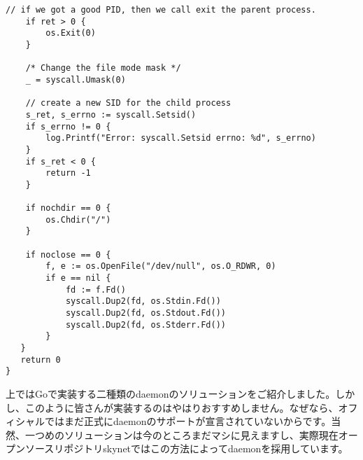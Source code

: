 \begin{itemize}
\begin{lstlisting}[numbers=none]
    // if we got a good PID, then we call exit the parent process.
    if ret > 0 {
        os.Exit(0)
    }

    /* Change the file mode mask */
    _ = syscall.Umask(0)

    // create a new SID for the child process
    s_ret, s_errno := syscall.Setsid()
    if s_errno != 0 {
        log.Printf("Error: syscall.Setsid errno: %d", s_errno)
    }
    if s_ret < 0 {
        return -1
    }

    if nochdir == 0 {
        os.Chdir("/")
    }

    if noclose == 0 {
        f, e := os.OpenFile("/dev/null", os.O_RDWR, 0)
        if e == nil {
            fd := f.Fd()
            syscall.Dup2(fd, os.Stdin.Fd())
            syscall.Dup2(fd, os.Stdout.Fd())
            syscall.Dup2(fd, os.Stderr.Fd())
        }
   }
   return 0
}    
\end{lstlisting}
\end{itemize}

上ではGoで実装する二種類のdaemonのソリューションをご紹介しました。しかし、このように皆さんが実装するのはやはりおすすめしません。なぜなら、オフィシャルではまだ正式にdaemonのサポートが宣言されていないからです。当然、一つめのソリューションは今のところまだマシに見えますし、実際現在オープンソースリポジトリskynetではこの方法によってdaemonを採用しています。
